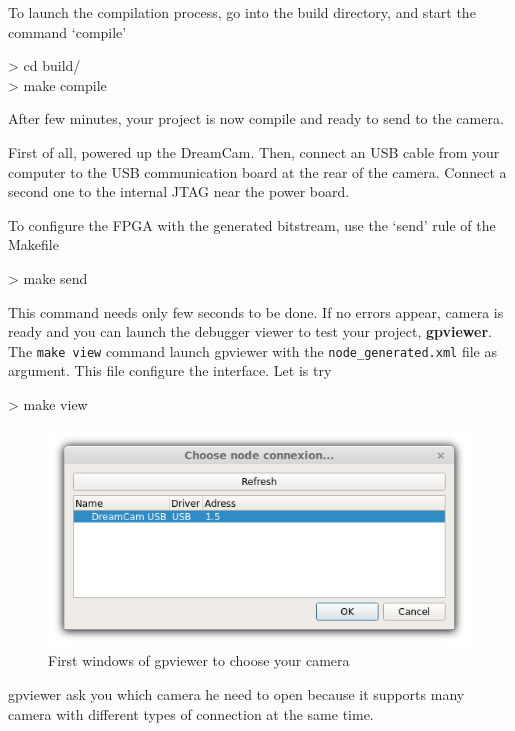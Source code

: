 \documentclass[10pt,a4paper]{article}
\begin{document}
To launch the compilation process, go into the build directory, and start the command `compile'

\begin{sample}
> cd build/\\
> make compile
\end{sample}

After few minutes, your project is now compile and ready to send to the camera.

First of all, powered up the DreamCam. Then, connect an USB cable from your computer to the USB communication board at the rear of the camera. Connect a second one to the internal JTAG near the power board.

To configure the FPGA with the generated bitstream, use the `send' rule of the Makefile

\begin{sample}
> make send
\end{sample}

This command needs only few seconds to be done. If no errors appear, camera is ready and you can launch the debugger viewer to test your project, \textbf{gpviewer}. The \texttt{make view} command launch gpviewer with the \texttt{node\_generated.xml} file as argument. This file configure the interface. Let is try

\begin{sample}
> make view
\end{sample}

\begin{figure}[h!]
\centering
\includegraphics[scale=0.6]{gpviewer_connect_node.jpg}
\caption{First windows of gpviewer to choose your camera}
\end{figure}

gpviewer ask you which camera he need to open because it supports many camera with different types of connection at the same time.
\end{document}
